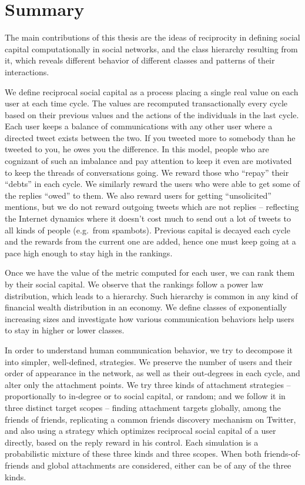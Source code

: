 \documentclass[10pt,oneside]{memoir}
\begin{document}
\mainmatter


\chapter{Summary}
\label{summary}

\begin{Spacing}{2}


The main contributions of this thesis are the ideas of reciprocity in defining social capital computationally in social networks, and the class hierarchy resulting from it, which reveals different behavior of different classes and patterns of their interactions.


We define reciprocal social capital as a process placing a single real value on each user at each time cycle.  The values are recomputed transactionally every cycle based on their previous values and the actions of the individuals in the last cycle.  Each user keeps a balance of communications with any other user where a directed tweet exists between the two.  If you tweeted more to somebody than he tweeted to you, he owes you the difference.  In this model, people who are cognizant of such an imbalance and pay attention to keep it even are motivated to keep the threads of conversations going.  We reward those who ``repay'' their ``debts'' in each cycle.  We similarly reward the users who were able to get some of the replies ``owed'' to them.  We also reward users for getting ``unsolicited'' mentions, but we do not reward outgoing tweets which are not replies -- reflecting the Internet dynamics where it doesn't cost much to send out a lot of tweets to all kinds of people (e.g.\ from spambots).  Previous capital is decayed each cycle and the rewards from the current one are added, hence one must keep going at a pace high enough to stay high in the rankings.


Once we have the value of the metric computed for each user, we can rank them by their social capital.  We observe that the rankings follow a power law distribution, which leads to a hierarchy.  Such hierarchy is common in any kind of financial wealth distribution in an economy.  We define classes of exponentially increasing sizes and investigate how various communication behaviors help users to stay in higher or lower classes.  


In order to understand human communication behavior, we try to decompose it into simpler, well-defined, strategies.  We preserve the number of users and their order of appearance in the network, as well as their out-degrees in each cycle, and alter only the attachment points.  We try three kinds of  attachment strategies -- proportionally to in-degree or to social capital, or random; and we follow it in three distinct target scopes -- finding attachment targets globally, among the friends of friends, replicating a common friends discovery mechanism on Twitter, and also using a strategy which optimizes reciprocal social capital of a user directly, based on the reply reward in his control.  Each simulation is a probabilistic mixture of these three kinds and three scopes.  When both friends-of-friends and global attachments are considered, either can be of any of the three kinds.



\end{Spacing}
\end{document}
